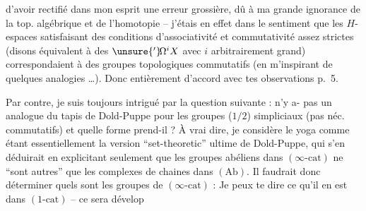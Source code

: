 d'avoir rectifié dans mon esprit une erreur grossière, dû à ma grande ignorance de la top. algébrique et de l'homotopie -- j'étais en effet dans le sentiment que les $H$-espaces satisfaisant des conditions d'associativité et commutativité assez strictes (disons équivalent à des $\unsure{{}'}\!\Omega^{i}X$ avec $i$ arbitrairement grand) correspondaient à des  groupes topologiques commutatifs (en m'inspirant de quelques analogies \dots). Donc entièrement d'accord avec tes observations p.~5.

Par contre, je suis toujours intrigué par la question suivante : n'y  a- pas un analogue du tapis de Dold-Puppe pour les groupes ($1/2$) simpliciaux (pas néc. commutatifs) et quelle forme prend-il ? À vrai dire, je considère le yoga
comme étant essentiellement la version ``set-theoretic'' ultime de Dold-Puppe, qui s'en déduirait en explicitant seulement que les groupes abéliens dans $(\infty\text{-cat})$ ne ``sont autres'' que les complexes de chaines dans $(\mathrm{Ab})$. Il faudrait donc déterminer quels sont les groupes de $(\infty\text{-cat})$ : Je peux te dire ce qu'il en est dans $(1\text{-cat})$ -- ce sera dévelop%
